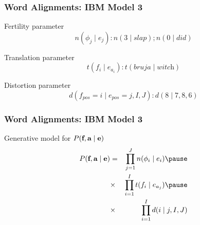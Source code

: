 \begin{frame}
\frametitle{Word Alignments: IBM Model 3}
\begin{block}{Fertility parameter}
\[ n(\phi_j \mid e_j) : n(3 \mid \textit{slap}) ; n(0 \mid \textit{did}) \]
\end{block}\pause
\begin{block}{Translation parameter}
\[ t(f_i \mid e_{a_i}) : t(\textit{bruja} \mid \textit{witch}) \]
\end{block}\pause
\begin{block}{Distortion parameter}
\[ d(f_{\textit{pos}} = i \mid e_{\textit{pos}} = j, I, J) : d(8 \mid 7, 8, 6) \]
\end{block}
\end{frame}

\begin{frame}
\frametitle{Word Alignments: IBM Model 3}
\begin{block}{Generative model for $P(\textbf{f}, \textbf{a} \mid \textbf{e})$}
\begin{eqnarray*}
P(\src, \aln \mid \tgt) & = & \prod_{j=1}^J n(\phi_i \mid e_i)  \pause\\
& \times & \prod_{i=1}^I t(f_i \mid e_{a_j}) \pause\\
& \times & \prod_{i=1}^I d(i \mid j, I, J)
\end{eqnarray*}
\end{block}
\end{frame}


